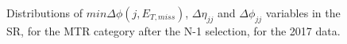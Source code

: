 \begin{figure}[htbp]
  \caption{Distributions of $min\Delta\phi(j,E_{T,miss})$, $\Delta \eta_{jj}$ and $\Delta \phi_{jj}$ variables in the SR, for the MTR category after the N-1 selection, for the 2017 data.}
  \label{fig:sr_n-1_shapes_1}
\end{figure}


\begin{figure}[htbp]
  \centering
    \\
    \subfigure[$p_{T,j1}$]{
}
\end{figure}
